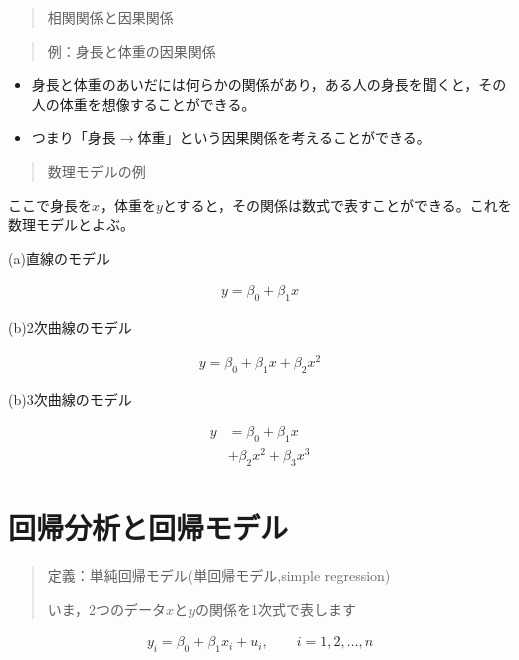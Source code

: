 \documentclass[
]{book}
\providecommand{\tightlist}{%
  \setlength{\itemsep}{0pt}\setlength{\parskip}{0pt}}
\theoremstyle{definition}
\theoremstyle{definition}
\theoremstyle{definition}
\theoremstyle{definition}
\theoremstyle{remark}
\begin{document}
\begin{quote}
相関関係と因果関係
\end{quote}

\begin{quote}
例：身長と体重の因果関係
\end{quote}

\begin{itemize}
\tightlist
\item
  身長と体重のあいだには何らかの関係があり，ある人の身長を聞くと，その人の体重を想像することができる。
\item
  つまり「身長\(\rightarrow\)体重」という因果関係を考えることができる。
\end{itemize}

\begin{quote}
数理モデルの例
\end{quote}

ここで身長を\(x\)，体重を\(y\)とすると，その関係は数式で表すことができる。これを数理モデルとよぶ。

(a)直線のモデル

\begin{align*}
y=\beta_0+\beta_1 x
\end{align*}

(b)2次曲線のモデル

\begin{align*}
y=\beta_0+\beta_1 x+\beta_2 x^2
\end{align*}

(b)3次曲線のモデル

\begin{align*}
y&=\beta_0+\beta_1 x \\
&+\beta_2 x^2+\beta_3 x^3
\end{align*}

\hypertarget{ux56deux5e30ux5206ux6790ux3068ux56deux5e30ux30e2ux30c7ux30eb}{%
\section{回帰分析と回帰モデル}\label{ux56deux5e30ux5206ux6790ux3068ux56deux5e30ux30e2ux30c7ux30eb}}

\begin{quote}
定義：単純回帰モデル(単回帰モデル,simple regression)

いま，2つのデータ\(x\)と\(y\)の関係を1次式で表します
\end{quote}

\begin{align*}
y_i=\beta_0+\beta_1 x_i+u_i, \qquad i=1,2,\dots,n
\end{align*}
\end{document}
